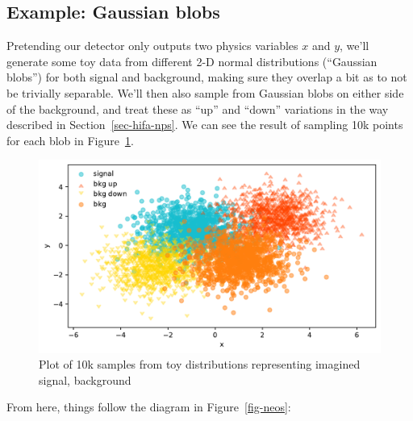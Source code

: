 \documentclass[
  11pt,
  numbers=noendperiod]{book}
\begin{document}
\hypertarget{example-gaussian-blobs}{%
\subsection{Example: Gaussian blobs}\label{example-gaussian-blobs}}

Pretending our detector only outputs two physics variables \(x\) and
\(y\), we'll generate some toy data from different 2-D normal
distributions (``Gaussian blobs'') for both signal and background,
making sure they overlap a bit as to not be trivially separable. We'll
then also sample from Gaussian blobs on either side of the background,
and treat these as ``up'' and ``down'' variations in the way described
in Section~\ref{sec-hifa-nps}. We can see the result of sampling 10k
points for each blob in Figure~\ref{fig-data-space}.

\begin{figure}

{\centering \includegraphics{./images/data-space.pdf}

}

\caption{\label{fig-data-space}Plot of 10k samples from toy
distributions representing imagined signal, background}

\end{figure}

From here, things follow the diagram in Figure~\ref{fig-neos}:
\end{document}
